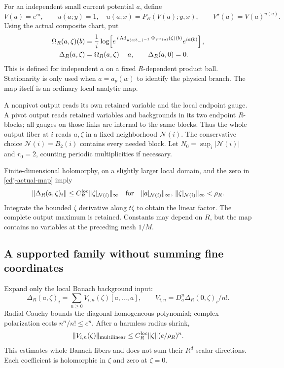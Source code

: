 For an independent small current potential $a$, define
\[
 V(a)=e^{ia},\qquad
 u(a;y)=1,\quad u(a;x)=P_R(V(a);y,x),\qquad
 V^\star(a)=V(a)^{u(a)}.
\]
Using the actual composite chart, put
\begin{align}
 \Omega_R(a,\zeta)(b)
  &=\frac1i\log\!\left[
    e^{\,i\operatorname{Ad}_{u(a;b_-)^{-1}}
                 \Phi_{V^\star(a)}(\zeta)(b)}
       e^{ia(b)}\right],\notag\\
 \Delta_R(a,\zeta)&=\Omega_R(a,\zeta)-a,\qquad
 \Delta_R(a,0)=0.                                      \label{cdj-actual-map}
\end{align}
This is defined for independent $a$ on a fixed
$R$-dependent product ball. Stationarity is only used when
$a=a_p(w)$ to identify the physical branch. The map itself
is an ordinary local analytic map.

A nonpivot output reads its own retained variable and
the local endpoint gauge. A pivot output reads retained
variables and backgrounds in its two endpoint $R$-blocks;
all gauges on those links are internal to the same blocks.
Thus the whole output fiber at $i$ reads $a,\zeta$ in a
fixed neighborhood $\mathcal N(i)$. The conservative choice
$\mathcal N(i)=B_2(i)$ contains every needed block.
Let $N_0=\sup_i|\mathcal N(i)|$ and $r_0=2$, counting
periodic multiplicities if necessary.

Finite-dimensional holomorphy, on a slightly larger local
domain, and the zero in \eqref{cdj-actual-map} imply
\begin{equation}\label{cdj-local-bound}
 \|\Delta_R(a,\zeta)_i\|
    \le C_R^{\rm loc}\|\zeta|_{\mathcal N(i)}\|_\infty
 \quad\text{for}\quad
 \|a|_{\mathcal N(i)}\|_\infty,\,
 \|\zeta|_{\mathcal N(i)}\|_\infty<\rho_R.
\end{equation}
Integrate the bounded $\zeta$ derivative along $t\zeta$
to obtain the linear factor. The complete output maximum
is retained. Constants may depend on $R$, but the map
contains no variables at the preceding mesh $1/M$.

\subsection{A supported family without summing fine coordinates}
\label{cdj-Banach-Taylor-section}

Expand only the local Banach background input:
\[
 \Delta_R(a,\zeta)_i
   =\sum_{n\ge0}V_{i,n}(\zeta)[a,\ldots,a],
 \qquad V_{i,n}=D_a^n\Delta_R(0,\zeta)_i/n!.
\]
Radial Cauchy bounds the diagonal homogeneous polynomial;
complex polarization costs $n^n/n!\le e^n$. After a
harmless radius shrink,
\begin{equation}\label{cdj-vertex-bound}
 \|V_{i,n}(\zeta)\|_{\rm multilinear}
       \le C_R^{\rm loc}\|\zeta\|(e/\rho_R)^n.
\end{equation}
This estimates whole Banach fibers and does not sum their
$R^d$ scalar directions. Each coefficient is holomorphic
in $\zeta$ and zero at $\zeta=0$.

